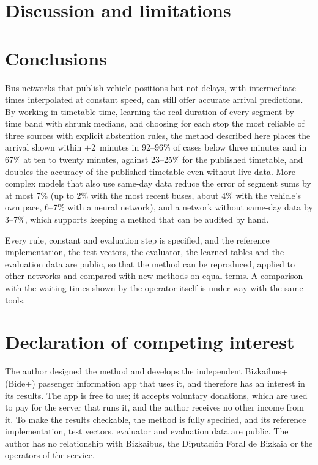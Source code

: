 \documentclass[preprint,11pt,nonatbib]{elsarticle}
\begin{document}
\section{Discussion and limitations}
\label{sec:discussion}



\section{Conclusions}
\label{sec:conclusions}

Bus networks that publish vehicle positions but not delays, with intermediate times interpolated at constant speed,
can still offer accurate arrival predictions. By working in timetable time, learning the real duration of every
segment by time band with shrunk medians, and choosing for each stop the most reliable of three sources with explicit
abstention rules, the method described here places the arrival shown within $\pm2$~minutes in 92--96\% of cases below
three minutes and in 67\% at ten to twenty minutes, against 23--25\% for the published timetable, and doubles the
accuracy of the published timetable even without live data. More complex models that also use same-day data reduce
the error of segment sums by at most 7\% (up to 2\% with the most recent buses, about 4\% with the vehicle's own
pace, 6--7\% with a neural network), and a network without same-day data by 3--7\%, which supports keeping a method that can be audited by hand.

Every rule, constant and evaluation step is specified, and the reference implementation, the test vectors, the
evaluator, the learned tables and the evaluation data are public, so that the method can be reproduced, applied to
other networks and compared with new methods on equal terms. A comparison with the waiting times shown by the operator
itself is under way with the same tools.

\section*{Declaration of competing interest}
The author designed the method and develops the independent Bizkaibus+ (Bide+) passenger information app that uses
it, and therefore has an interest in its results. The app is free to use; it accepts voluntary donations, which are used
to pay for the server that runs it, and the author receives no other income from it. To make the results checkable, the
method is fully specified, and its reference implementation, test vectors, evaluator and evaluation data are public.
The author has no relationship with Bizkaibus, the Diputación Foral de Bizkaia or the operators of the service.
\end{document}
